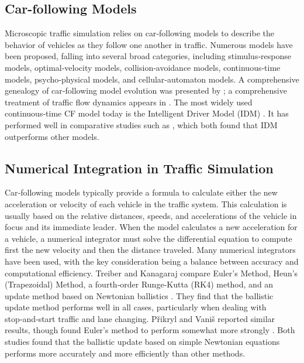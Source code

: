 \documentclass{scspaperproc}
\theoremstyle{scsthe}
\begin{document}
\subsection{Car-following Models}
Microscopic traffic simulation relies on car‑following models to describe the behavior of vehicles as they follow
one another in traffic. Numerous models have been proposed, falling into several broad categories, including
stimulus‑response models, optimal‑velocity models, collision‑avoidance models, continuous‑time models,
psycho‑physical models, and cellular‑automaton models. A comprehensive genealogy of car‑following model evolution
was presented by \cite{van2015genealogy}; a comprehensive treatment of traffic flow dynamics appears in \cite{kesting2013traffic}. The most widely used continuous‑time CF model today is the Intelligent
Driver Model (IDM) \cite{treiber2000congested}. It has performed well in comparative studies such as
\cite{zhang2021comprehensive, pourabdollah2017calibration}, which both found that IDM outperforms other models.

\subsection{Numerical Integration in Traffic Simulation}
Car‑following models typically provide a formula to calculate either the new acceleration or velocity of each
vehicle in the traffic system. This calculation is usually based on the relative distances, speeds, and
accelerations of the vehicle in focus and its immediate leader. When the model calculates a new acceleration for a
vehicle, a numerical integrator must solve the differential equation to compute first the new velocity and then the
distance traveled. Many numerical integrators have been used, with the key consideration being a balance between
accuracy and computational efficiency. Treiber and Kanagaraj compare Euler’s Method, Heun’s (Trapezoidal) Method, a
fourth‑order Runge‑Kutta (RK4) method, and an update method based on Newtonian ballistics
\cite{treiber2015comparing}. They find that the ballistic update method performs well in all cases, particularly
when dealing with stop‑and‑start traffic and lane changing. P\v{r}ikryl and Vani\v{s} reported similar results,
though found Euler’s method to perform somewhat more strongly \cite{pvrikryl2017comparing}. Both studies found that
the ballistic update based on simple Newtonian equations performs more accurately and more efficiently than other
methods.
\end{document}
